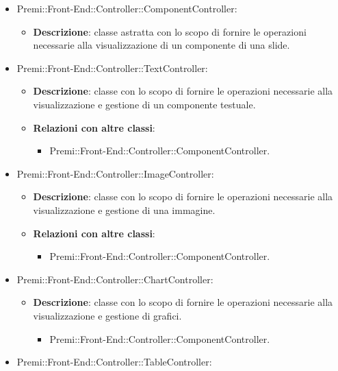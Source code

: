\begin{itemize}
\begin{itemize}
			\end{itemize}
		\item  Premi::Front-End::Controller::ComponentController: 
			 \begin{itemize}
				\item \textbf{Descrizione}: classe astratta con lo scopo di fornire le operazioni necessarie alla visualizzazione di un componente di una \gls{slide}.
			\end{itemize}
		\item  Premi::Front-End::Controller::TextController: 
			 \begin{itemize}
				\item \textbf{Descrizione}: classe con lo scopo di fornire le operazioni necessarie alla visualizzazione e gestione di un componente testuale.
				\item \textbf{Relazioni con altre classi}:
				\begin{itemize}
					\item Premi::Front-End::Controller::ComponentController.
				\end{itemize}
			\end{itemize}
		\item  Premi::Front-End::Controller::ImageController: 
			 \begin{itemize}
				\item \textbf{Descrizione}: classe con lo scopo di fornire le operazioni necessarie alla visualizzazione e gestione di una immagine.
				\item \textbf{Relazioni con altre classi}:
				\begin{itemize}
					\item Premi::Front-End::Controller::ComponentController.
				\end{itemize}
			\end{itemize}
		\item  Premi::Front-End::Controller::ChartController: 
			 \begin{itemize}
				\item \textbf{Descrizione}: classe con lo scopo di fornire le operazioni necessarie alla visualizzazione e gestione di grafici.
				\begin{itemize}
					\item Premi::Front-End::Controller::ComponentController.
				\end{itemize}
			 \end{itemize}
		\item  Premi::Front-End::Controller::TableController: 
			 \begin{itemize}

\end{itemize}
\end{itemize}
